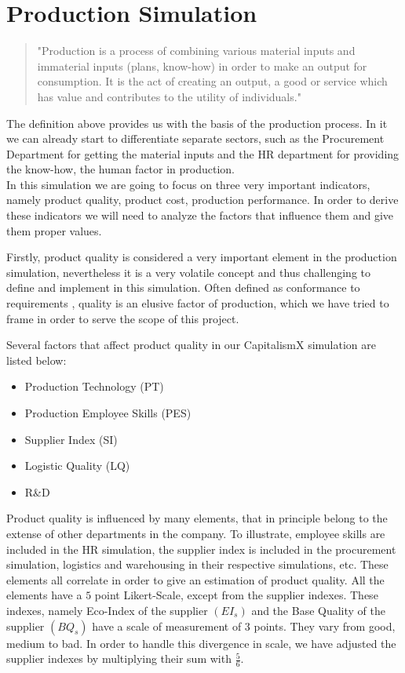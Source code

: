 \section{Production Simulation}
\label{sec:productionSim}
 \begin{quotation}
"Production is a process of combining various material inputs and immaterial inputs (plans, know-how) in order to make an output for consumption. It is the act of creating an output, a good or service which has value and contributes to the utility of individuals."\cite{noauthor_production_2019}
 \end{quotation}
The definition above provides us with the basis of the production process. In it we can already start to differentiate separate sectors, such as the Procurement Department for getting the material inputs and the HR department for providing the know-how, the human factor in production. \\
In this simulation we are going to focus on three very important indicators, namely product quality, product cost, production performance. In order to derive these indicators we will need to analyze the factors that influence them and give them proper values. 

Firstly, product quality is considered a very important element in the production simulation, nevertheless it is a very volatile concept and thus challenging to define and implement in this simulation. Often defined as conformance to requirements \cite{crosby_quality_1979}, quality is an elusive factor of production, which we have tried to frame in order to serve the scope of this project.

 Several factors that affect product quality in our CapitalismX simulation are listed below:
\begin{itemize}
\item Production Technology (PT)
\item Production Employee Skills (PES)
\item Supplier Index (SI)
\item Logistic Quality (LQ)
\item R\&D
\end{itemize}
Product quality is influenced by many elements, that in principle belong to the extense of other departments in the company. To illustrate, employee skills are included in the HR simulation, the supplier index is included in the procurement simulation, logistics and warehousing in their respective simulations, etc.
These elements all correlate in order to give an estimation of product quality.
All the elements have a $5$ point Likert-Scale, except from the supplier indexes.
These indexes, namely Eco-Index of the supplier $(EI_{s})$ and the Base Quality of the supplier $(BQ_{s})$ have a scale of measurement of $3$ points. They vary from good, medium to bad. In order to handle this divergence in scale, we have adjusted the supplier indexes by multiplying their sum with $\frac{5}{6}$.

